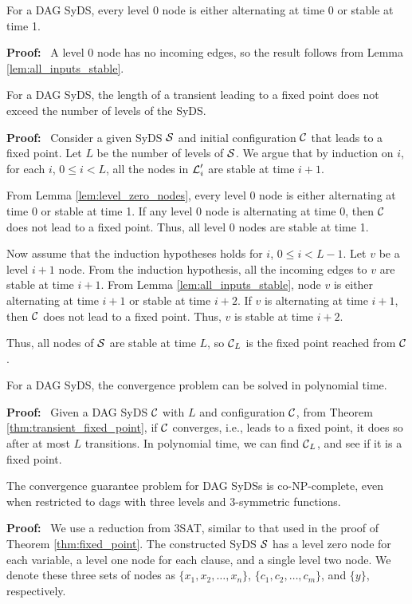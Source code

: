 \begin{lemma}\label{lem:level_zero_nodes}
For a DAG SyDS, every level 0 node is either alternating at time 0 or stable at time 1.
\end{lemma}
\noindent
\textbf{Proof:}~ 
 A level 0 node has no incoming edges,
so the result follows from Lemma \ref{lem:all_inputs_stable}.
\QED

\begin{theorem}\label{thm:transient_fixed_point}
For a DAG SyDS,
the length of a transient leading to a fixed point does not exceed the number of levels of the SyDS.
\end{theorem}
\noindent
\textbf{Proof:}~ 
Consider a given SyDS $\mbox{$\mathcal{S}$}$ and initial configuration $\mbox{$\mathcal{C}$}$ that leads to a fixed point.
Let $L$ be the number of levels of $\mbox{$\mathcal{S}$}$.
We argue that by induction on $i$, for each $i$, $0 \leq i < L$,
all the nodes in $\mbox{$\mathcal{L}$}_i'$ are stable at time $i+1$.

From Lemma \ref{lem:level_zero_nodes},
every level 0 node is either alternating at time 0 or stable at time 1.
If any level 0 node is alternating at time 0, then $\mbox{$\mathcal{C}$}$ does not lead to a fixed point.
Thus, all level 0 nodes are stable at time 1.

Now assume that the induction hypotheses holds for $i$, $0 \leq i < L-1$.
Let $v$ be a level $i+1$ node.
From the induction hypothesis, all the incoming edges to $v$ are stable at time $i+1$.
From Lemma \ref{lem:all_inputs_stable},
node $v$ is either alternating at time $i+1$ or stable at time $i+2$.
If $v$ is alternating at time $i+1$, then $\mbox{$\mathcal{C}$}$ does not lead to a fixed point.
Thus, $v$ is stable at time $i+2$.

Thus, all nodes of $\mbox{$\mathcal{S}$}$ are stable at time $L$,
so  $\mbox{$\mathcal{C}$}_L$ is the fixed point reached from $\mbox{$\mathcal{C}$}$.
\QED

\iffalse

\begin{corollary}\label{cor:convergence}
For a DAG SyDS, the convergence problem can be solved in polynomial time.
\end{corollary}
\noindent
\textbf{Proof:}~ Given a DAG SyDS $\mbox{$\mathcal{C}$}$ with $L$ and configuration $\mbox{$\mathcal{C}$}$,
from Theorem \ref{thm:transient_fixed_point},
if $\mbox{$\mathcal{C}$}$ converges, i.e., leads to a fixed point,
it does so after at most $L$ transitions.
In polynomial time, we can find $\mbox{$\mathcal{C}$}_L$, and see if it is a fixed point.
\QED

\begin{theorem}\label{thm:convergence_guaranee}
The convergence guarantee problem for DAG SyDSs is co-NP-complete,
even when restricted to dags with  three levels and 3-symmetric functions.
\end{theorem}
\noindent
\textbf{Proof:}~ 
We use a reduction from 3SAT, similar to that used in the proof of Theorem \ref{thm:fixed_point}.
The constructed SyDS $\mbox{$\mathcal{S}$}$ has a level zero node for each variable, 
a level one node for each clause, and a single level two node.
We denote these three sets of nodes as $\{x_1, x_2, \ldots , x_n\}$,
$\{c_1,c_2, \ldots , c_m\}$, and $\{y\}$, respectively.

